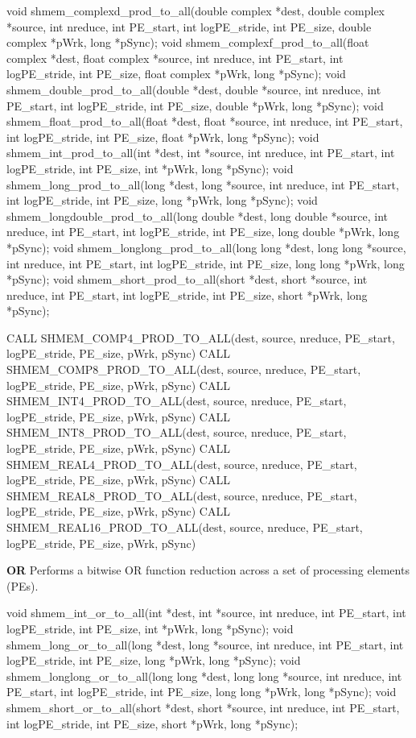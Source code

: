 void shmem_complexd_prod_to_all(double complex *dest, double complex *source, int nreduce, int PE_start, int logPE_stride, int PE_size, double complex *pWrk, long *pSync);
void shmem_complexf_prod_to_all(float complex *dest, float complex *source, int nreduce, int PE_start, int logPE_stride, int PE_size, float complex *pWrk, long *pSync);
void shmem_double_prod_to_all(double *dest, double *source, int nreduce, int PE_start, int logPE_stride, int PE_size, double *pWrk, long *pSync);
void shmem_float_prod_to_all(float *dest, float *source, int nreduce, int PE_start, int logPE_stride, int PE_size, float *pWrk, long *pSync);
void shmem_int_prod_to_all(int *dest, int *source, int nreduce, int PE_start, int logPE_stride, int PE_size, int *pWrk, long *pSync);
void shmem_long_prod_to_all(long *dest, long *source, int nreduce, int PE_start, int logPE_stride, int PE_size, long *pWrk, long *pSync);
void shmem_longdouble_prod_to_all(long double *dest, long double *source, int nreduce, int PE_start, int logPE_stride, int PE_size, long double *pWrk, long *pSync);
void shmem_longlong_prod_to_all(long long *dest, long long *source, int nreduce, int PE_start, int logPE_stride, int PE_size, long long *pWrk, long *pSync);
void shmem_short_prod_to_all(short *dest, short *source, int nreduce, int PE_start, int logPE_stride, int PE_size, short *pWrk, long *pSync);
\synF %

CALL SHMEM_COMP4_PROD_TO_ALL(dest, source, nreduce, PE_start, logPE_stride, PE_size, pWrk, pSync)
CALL SHMEM_COMP8_PROD_TO_ALL(dest, source, nreduce, PE_start, logPE_stride, PE_size, pWrk, pSync)
CALL SHMEM_INT4_PROD_TO_ALL(dest, source, nreduce, PE_start, logPE_stride, PE_size, pWrk, pSync)
CALL SHMEM_INT8_PROD_TO_ALL(dest, source, nreduce, PE_start, logPE_stride, PE_size, pWrk, pSync)
CALL SHMEM_REAL4_PROD_TO_ALL(dest, source, nreduce, PE_start, logPE_stride, PE_size, pWrk, pSync)
CALL SHMEM_REAL8_PROD_TO_ALL(dest, source, nreduce, PE_start, logPE_stride, PE_size, pWrk, pSync)
CALL SHMEM_REAL16_PROD_TO_ALL(dest, source, nreduce, PE_start, logPE_stride, PE_size, pWrk, pSync)

\bigskip
\textbf{OR} \newline
Performs  a  bitwise  OR  function reduction across a set of processing elements (\ac{PE}s).\newline
\synC %

void shmem_int_or_to_all(int *dest, int *source, int nreduce, int PE_start, int logPE_stride, int PE_size, int *pWrk, long *pSync);
void shmem_long_or_to_all(long *dest, long *source, int nreduce, int PE_start, int logPE_stride, int PE_size, long *pWrk, long *pSync);
void shmem_longlong_or_to_all(long long *dest, long long *source, int nreduce, int PE_start, int logPE_stride, int PE_size, long long *pWrk, long *pSync);
void shmem_short_or_to_all(short *dest, short *source, int nreduce, int PE_start, int logPE_stride, int PE_size, short *pWrk, long *pSync);
\synF %

